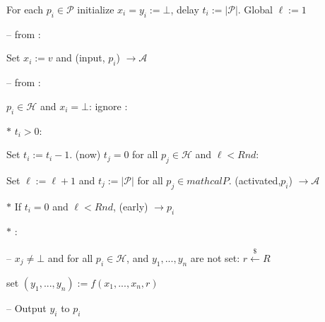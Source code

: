 \begin{bbox}[title={$\F_{\msf{sfe}}^{f,Rnd} (\mathcal{P})$}]

For each $p_i \in \mathcal{P}$ initialize $x_i = y_i := \bot$, delay $t_i := |\mathcal{P}|$.
Global $\ell := 1$

-- \OnInput {} from \Partyi:

	\qquad Set $x_i := v$ and \Send (input, $p_i$) $\rightarrow \mathcal{A}$

-- \OnInput {} from \Partyi:

	\qquad \If $p_i \in \mathcal{H}$ and $x_i = \bot$: ignore \Else:

		\qqquad $*$ \If $t_i > 0$:

			\qqqquad Set $t_i := t_i - 1$. \If (now) $t_j = 0$ for all $p_j \in \mathcal{H}$ and $\ell < Rnd$:

				\qqqqquad Set $\ell := \ell + 1$ and $t_j := |\mathcal{P}|$ for all $p_j \in mathcal{P}$. \Send (activated,$p_i$) $\rightarrow \mathcal{A}$

		\qqquad $*$ \Else If $t_i = 0$ and $\ell < Rnd$, \Send (early) $\rightarrow p_i$

		\qqquad $*$ \Else:

			\qqqquad -- \If $x_j \neq \bot$ and for all $p_i \in \mathcal{H}$, and $y_1,...,y_n$ are not set: $r \xleftarrow{\$} R$ 
			
				\qqqqquad set $(y_1,...,y_n) := f(x_1,...,x_n, r)$

			\qqqquad -- Output $y_i$ to $p_i$

\end{bbox}
